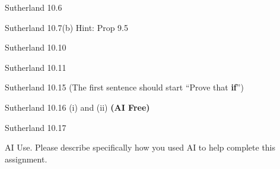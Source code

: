 \documentclass[minion]{homework}
\begin{document}
\begin{problems}

\problem Sutherland 10.6

\problem Sutherland 10.7(b) Hint: Prop 9.5

\problem Sutherland 10.10

\problem Sutherland 10.11

\problem Sutherland 10.15 (The first sentence should start ``Prove that \textbf{if}'')

\problem Sutherland 10.16 (i) and (ii) \textbf{(AI Free)}

\problem Sutherland 10.17

\problem AI Use. Please describe specifically how you used AI to help complete this assignment.

\end{problems}
\end{document}
